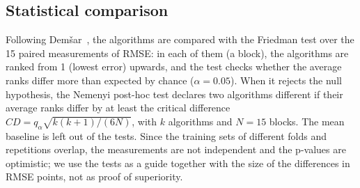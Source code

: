 \subsection{Statistical comparison}
\label{sec:stats}

Following Dem\v{s}ar~\cite{demsar2006statistical}, the algorithms are compared with the Friedman test over
the 15 paired measurements of RMSE: in each of them (a block), the algorithms are ranked from 1
(lowest error) upwards, and the test checks whether the average ranks differ more than expected by
chance ($\alpha = 0.05$). When it rejects the null hypothesis, the Nemenyi post-hoc test declares
two algorithms different if their average ranks differ by at least the critical difference
$CD = q_\alpha \sqrt{k(k+1)/(6N)}$, with $k$ algorithms and $N = 15$ blocks. The mean baseline is
left out of the tests. Since the training sets of different folds and repetitions overlap, the
measurements are not independent and the p-values are optimistic; we use the tests as a guide
together with the size of the differences in RMSE points, not as proof of superiority.

